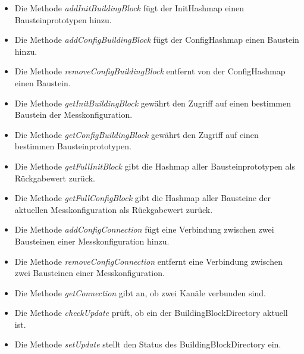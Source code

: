 \documentclass[parskip=full]{scrartcl}
\begin{document}
\begin{itemize}

\item Die Methode \textit{addInitBuildingBlock} fügt der InitHashmap einen Bausteinprototypen hinzu.
\item Die Methode \textit{addConfigBuildingBlock} fügt der ConfigHashmap einen Baustein hinzu.
\item Die Methode \textit{removeConfigBuildingBlock} entfernt von der ConfigHashmap einen Baustein.
\item Die Methode \textit{getInitBuildingBlock} gewährt den Zugriff auf einen bestimmen Baustein der Messkonfiguration.
\item Die Methode \textit{getConfigBuildingBlock} gewährt den Zugriff auf einen bestimmen Bausteinprototypen.
\item Die Methode \textit{getFullInitBlock} gibt die Hashmap aller Bausteinprototypen als Rückgabewert zurück.
\item Die Methode \textit{getFullConfigBlock} gibt die Hashmap aller Bausteine der aktuellen Messkonfiguration als Rückgabewert zurück.

\item Die Methode \textit{addConfigConnection} fügt eine Verbindung zwischen zwei Bausteinen einer Messkonfiguration hinzu.
\item Die Methode \textit{removeConfigConnection} entfernt eine Verbindung zwischen zwei Bausteinen einer Messkonfiguration.
\item Die Methode \textit{getConnection} gibt an, ob zwei Kanäle verbunden sind.


\item Die Methode \textit{checkUpdate} prüft, ob ein der BuildingBlockDirectory aktuell ist.
\item Die Methode \textit{setUpdate} stellt den Status des BuildingBlockDirectory ein.
\end{itemize}
\end{document}

